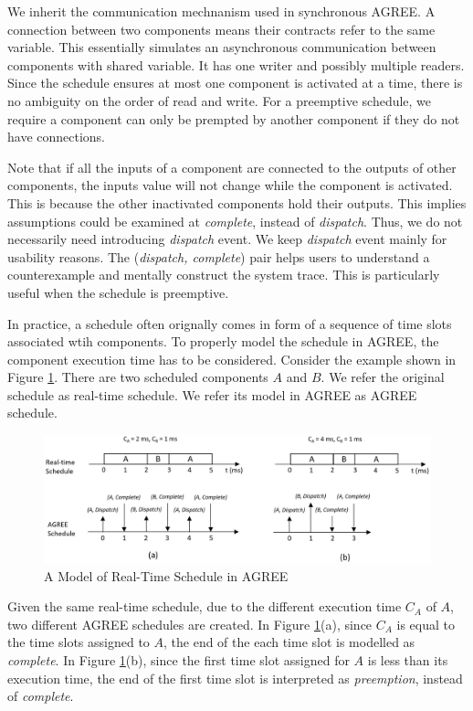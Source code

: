 We inherit the communication mechnanism used in synchronous AGREE. A connection between two components means their contracts refer to the same variable. 
This essentially simulates an asynchronous communication between components with shared variable. It has one writer and possibly multiple readers. Since the schedule ensures at most one component is activated at a time, there is no ambiguity on the order of read and write. For a preemptive schedule, we require a component can only be prempted by another component if they do not have connections.

Note that if all the inputs of a component are connected to the outputs of other components, the inputs value will not change while the component is activated. This is because the other inactivated components hold their outputs. This implies assumptions could be examined at \emph{complete}, instead of \emph{dispatch}. Thus, we do not necessarily need introducing \emph{dispatch} event. We keep \emph{dispatch} event mainly for usability reasons. The (\emph{dispatch, complete}) pair helps users to understand a counterexample and mentally construct the system trace. This is particularly useful when the schedule is preemptive.

In practice, a schedule often orignally comes in form of a sequence of time slots associated wtih components. 
To properly model the schedule in AGREE, the component execution time has to be considered. Consider the example shown in Figure \ref{RTschedule}. There are two scheduled components $A$ and $B$. We refer the original schedule as real-time schedule. We refer its model in AGREE as AGREE schedule.
\begin{figure}[ht!]
\centering
\includegraphics[width=130mm]{RTschedule.jpg}
\caption{A Model of Real-Time Schedule in AGREE\label{RTschedule}}
\end{figure}
Given the same real-time schedule, due to the different execution time $C_A$ of $A$, two different AGREE schedules are created. In Figure \ref{RTschedule}(a), since $C_A$ is equal to the time slots assigned to $A$, the end of the each time slot is modelled as \emph{complete}. In Figure \ref{RTschedule}(b), since the first time slot assigned for $A$ is less than its execution time, the end of the first time slot is interpreted as \emph{preemption}, instead of \emph{complete}.

